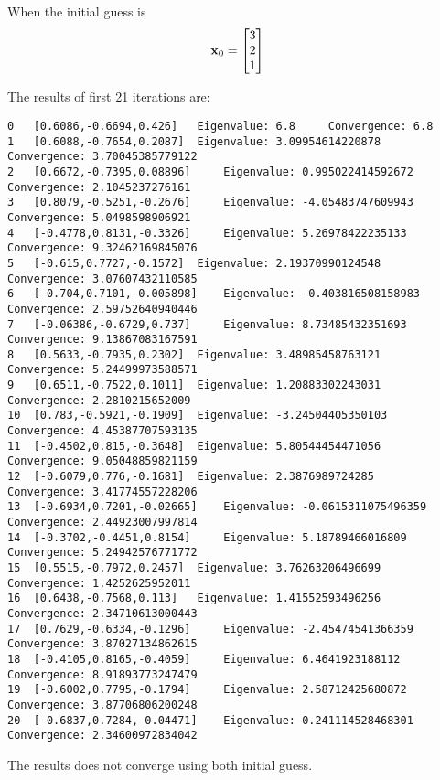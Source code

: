 \documentclass{article}
\begin{document}
\begin{enumerate}
When the initial guess is 
\begin{align}
\boldsymbol{\mathrm{x}}_0=\begin{bmatrix} 3 \\ 2 \\1  \end{bmatrix}
\end{align}

The results of first 21 iterations are: 
\begin{verbatim}
0	[0.6086,-0.6694,0.426]	 Eigenvalue: 6.8	 Convergence: 6.8
1	[0.6088,-0.7654,0.2087]	 Eigenvalue: 3.09954614220878	 Convergence: 3.70045385779122
2	[0.6672,-0.7395,0.08896]	 Eigenvalue: 0.995022414592672	 Convergence: 2.1045237276161
3	[0.8079,-0.5251,-0.2676]	 Eigenvalue: -4.05483747609943	 Convergence: 5.0498598906921
4	[-0.4778,0.8131,-0.3326]	 Eigenvalue: 5.26978422235133	 Convergence: 9.32462169845076
5	[-0.615,0.7727,-0.1572]	 Eigenvalue: 2.19370990124548	 Convergence: 3.07607432110585
6	[-0.704,0.7101,-0.005898]	 Eigenvalue: -0.403816508158983	 Convergence: 2.59752640940446
7	[-0.06386,-0.6729,0.737]	 Eigenvalue: 8.73485432351693	 Convergence: 9.13867083167591
8	[0.5633,-0.7935,0.2302]	 Eigenvalue: 3.48985458763121	 Convergence: 5.24499973588571
9	[0.6511,-0.7522,0.1011]	 Eigenvalue: 1.20883302243031	 Convergence: 2.2810215652009
10	[0.783,-0.5921,-0.1909]	 Eigenvalue: -3.24504405350103	 Convergence: 4.45387707593135
11	[-0.4502,0.815,-0.3648]	 Eigenvalue: 5.80544454471056	 Convergence: 9.05048859821159
12	[-0.6079,0.776,-0.1681]	 Eigenvalue: 2.3876989724285	 Convergence: 3.41774557228206
13	[-0.6934,0.7201,-0.02665]	 Eigenvalue: -0.0615311075496359	 Convergence: 2.44923007997814
14	[-0.3702,-0.4451,0.8154]	 Eigenvalue: 5.18789466016809	 Convergence: 5.24942576771772
15	[0.5515,-0.7972,0.2457]	 Eigenvalue: 3.76263206496699	 Convergence: 1.4252625952011
16	[0.6438,-0.7568,0.113]	 Eigenvalue: 1.41552593496256	 Convergence: 2.34710613000443
17	[0.7629,-0.6334,-0.1296]	 Eigenvalue: -2.45474541366359	 Convergence: 3.87027134862615
18	[-0.4105,0.8165,-0.4059]	 Eigenvalue: 6.4641923188112	 Convergence: 8.91893773247479
19	[-0.6002,0.7795,-0.1794]	 Eigenvalue: 2.58712425680872	 Convergence: 3.87706806200248
20	[-0.6837,0.7284,-0.04471]	 Eigenvalue: 0.241114528468301	 Convergence: 2.34600972834042
\end{verbatim}

The results does not converge using both initial guess. 




\end{enumerate} 
\end{document}
